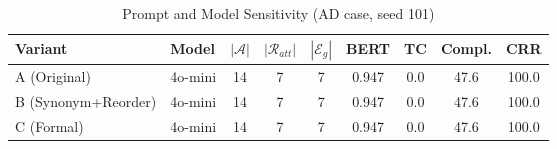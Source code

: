 \begin{table}[!t]
\centering
\caption{Prompt and Model Sensitivity (AD case, seed 101)}
\label{tab:prompt-sensitivity}
\begingroup
\small
\setlength{\tabcolsep}{3pt}
\begin{tabular}{llccccccc}
\toprule
\textbf{Variant} & \textbf{Model} & $|\mathcal{A}|$ & $|\mathcal{R}_{att}|$ & $|\mathcal{E}_g|$ & \textbf{BERT} & \textbf{TC} & \textbf{Compl.} & \textbf{CRR} \\
\midrule
A (Original)     & 4o-mini & 14 & 7 & 7 & 0.947 & 0.0 & 47.6 & 100.0 \\
B (Synonym+Reorder) & 4o-mini & 14 & 7 & 7 & 0.947 & 0.0 & 47.6 & 100.0 \\
C (Formal)       & 4o-mini & 14 & 7 & 7 & 0.947 & 0.0 & 47.6 & 100.0 \\
\bottomrule
\end{tabular}
\endgroup
\end{table}
